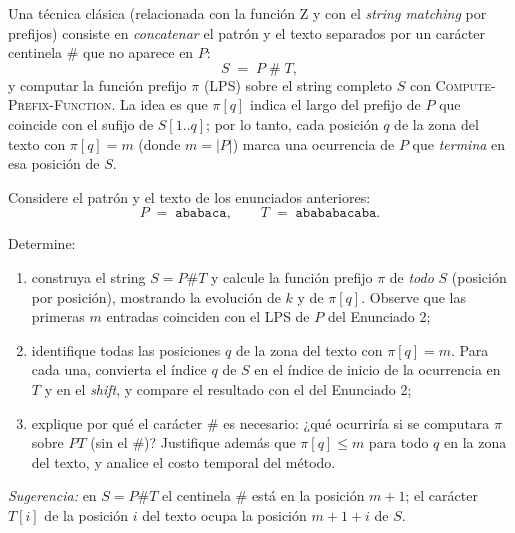 \documentclass[11pt]{article}
\begin{document}
Una técnica clásica (relacionada con la función Z y con el \emph{string matching} por prefijos) consiste en \emph{concatenar} el patrón y el texto separados por un carácter centinela \(\#\) que no aparece en \(P\):
\[
S \;=\; P\;\#\;T,
\]
y computar la función prefijo \(\pi\) (LPS) sobre el string completo \(S\) con \textsc{Compute-Prefix-Function}. La idea es que \(\pi[q]\) indica el largo del prefijo de \(P\) que coincide con el sufijo de \(S[1..q]\); por lo tanto, cada posición \(q\) de la zona del texto con \(\pi[q] = m\) (donde \(m=|P|\)) marca una ocurrencia de \(P\) que \emph{termina} en esa posición de \(S\).

Considere el patrón y el texto de los enunciados anteriores:
\[
P \;=\; \texttt{ababaca}, \qquad T \;=\; \texttt{abababacaba}.
\]

Determine:
\begin{enumerate}[label=(\alph*),itemsep=0.25em]
  \item construya el string \(S = P\#T\) y calcule la función prefijo \(\pi\) de \emph{todo} \(S\) (posición por posición), mostrando la evolución de \(k\) y de \(\pi[q]\). Observe que las primeras \(m\) entradas coinciden con el LPS de \(P\) del Enunciado 2;
  \item identifique todas las posiciones \(q\) de la zona del texto con \(\pi[q] = m\). Para cada una, convierta el índice \(q\) de \(S\) en el índice de inicio de la ocurrencia en \(T\) y en el \emph{shift}, y compare el resultado con el del Enunciado 2;
  \item explique por qué el carácter \(\#\) es necesario: ¿qué ocurriría si se computara \(\pi\) sobre \(P T\) (sin el \(\#\))? Justifique además que \(\pi[q]\le m\) para todo \(q\) en la zona del texto, y analice el costo temporal del método.
\end{enumerate}

\textit{Sugerencia:} en \(S=P\#T\) el centinela \(\#\) está en la posición \(m+1\); el carácter \(T[i]\) de la posición \(i\) del texto ocupa la posición \(m+1+i\) de \(S\).
\end{document}
